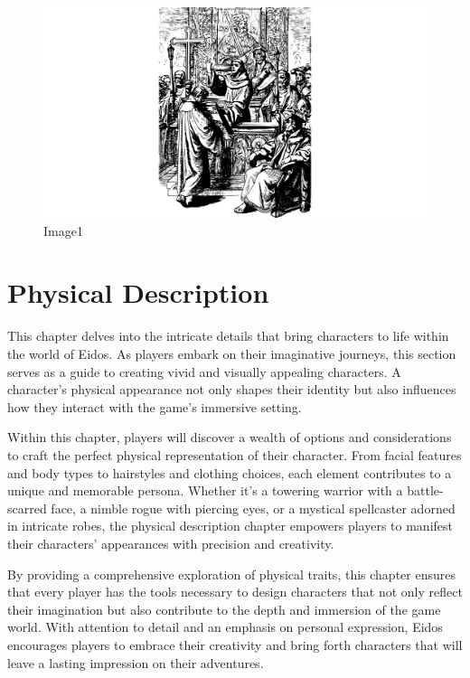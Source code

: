 \begin{figure}
\centering
\includegraphics{./images/religion06.pdf}
\caption{Image1}
\end{figure}

\hypertarget{physical-description}{%
\section{Physical Description}\label{physical-description}}

This chapter delves into the intricate details that bring characters to
life within the world of Eidos. As players embark on their imaginative
journeys, this section serves as a guide to creating vivid and visually
appealing characters. A character's physical appearance not only shapes
their identity but also influences how they interact with the game's
immersive setting.

Within this chapter, players will discover a wealth of options and
considerations to craft the perfect physical representation of their
character. From facial features and body types to hairstyles and
clothing choices, each element contributes to a unique and memorable
persona. Whether it's a towering warrior with a battle-scarred face, a
nimble rogue with piercing eyes, or a mystical spellcaster adorned in
intricate robes, the physical description chapter empowers players to
manifest their characters' appearances with precision and creativity.

By providing a comprehensive exploration of physical traits, this
chapter ensures that every player has the tools necessary to design
characters that not only reflect their imagination but also contribute
to the depth and immersion of the game world. With attention to detail
and an emphasis on personal expression, Eidos encourages players to
embrace their creativity and bring forth characters that will leave a
lasting impression on their adventures.

